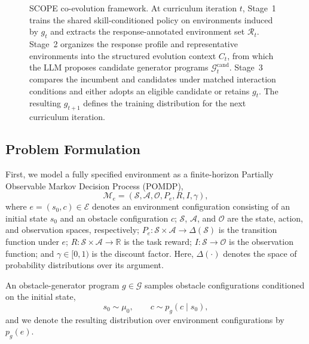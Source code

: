 \documentclass[conference]{IEEEtran}
\begin{document}
\begin{figure}[t]
\centering
\caption{SCOPE co-evolution framework. At curriculum iteration $t$, Stage~1
trains the shared skill-conditioned policy on environments induced by $g_t$ and
extracts the response-annotated environment set $\mathcal R_t$. Stage~2
organizes the response profile and representative environments into the
structured evolution context $C_t$, from which the LLM proposes candidate
generator programs $\mathcal G_t^{\mathrm{cand}}$. Stage~3 compares the
incumbent and candidates under matched interaction conditions and either adopts
an eligible candidate or retains $g_t$. The resulting $g_{t+1}$ defines the
training distribution for the next curriculum iteration.}
\label{fig:overview}
\end{figure}

\subsection{Problem Formulation}
\label{sec:prelim}
\label{sec:problem}
First, we model a fully specified environment as a finite-horizon Partially
Observable Markov Decision Process (POMDP),
\begin{equation}
 \mathcal{M}_e=
 \left(\mathcal{S},\mathcal{A},\mathcal{O},P_e,R,I,\gamma\right),
 \label{eq:pomdp}
\end{equation}
where $e=(s_0,c)\in\mathcal{E}$ denotes an environment configuration consisting
of an initial state $s_0$ and an obstacle configuration $c$;
$\mathcal{S}$, $\mathcal{A}$, and $\mathcal{O}$ are the state, action, and
observation spaces, respectively; $P_e:\mathcal{S}\times\mathcal{A}
\rightarrow\Delta(\mathcal{S})$ is the transition function under $e$;
$R:\mathcal{S}\times\mathcal{A}\rightarrow\mathbb{R}$ is the task reward;
$I:\mathcal{S}\rightarrow\mathcal{O}$ is the observation function; and
$\gamma\in[0,1)$ is the discount factor. Here, $\Delta(\cdot)$ denotes the space
of probability distributions over its argument.

An obstacle-generator program $g\in\mathcal{G}$ samples obstacle configurations
conditioned on the initial state,
\begin{equation}
 s_0\sim\mu_0,\qquad c\sim p_g(c\mid s_0),
 \label{eq:generator-distribution}
\end{equation}
and we denote the resulting distribution over environment configurations by
$p_g(e)$.
\end{document}
